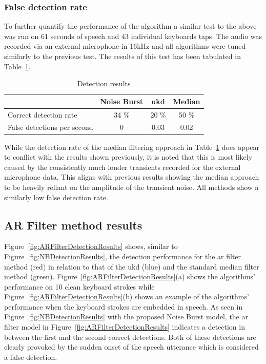 \subsubsection{False detection rate}\label{corrections:further_quantify}
To further quantify the performance of the algorithm a similar test to the above was run on 61 seconds of speech and 43 individual keyboards taps. The audio was recorded via an external microphone in 16kHz and all algorithms were tuned similarly to the previous test. The results of this test has been tabulated in Table~\ref{table:NBResultsTest}.

\begin{table}
\caption{Detection results}
\centering
\begin{tabular}{|l | c c c|}
\hline
                            & Noise Burst   & \gls{ukd}       & Median        \\
 \hline
 Correct detection rate     & 34 \%         & 20 \%     & 50 \%         \\
 False detections per second& 0             & 0.03      & 0.02          \\
 \hline
 \end{tabular}
 \label{table:NBResultsTest}
\end{table}

While the detection rate of the median filtering approach in Table~\ref{table:NBResultsTest} does appear to conflict with the results shown previously, it is noted that this is most likely caused by the consistently much louder transients recorded for the external microphone data. This aligns with previous results showing the median approach to be heavily reliant on the amplitude of the transient noise. All methods show a similarly low false detection rate.

\subsection{AR Filter method results}
Figure~\ref{fig:ARFilterDetectionResults} shows, similar to Figure~\ref{fig:NBDetectionResults}, the detection performance for the \gls{ar} filter method (red) in relation to that of the \gls{ukd}\cite{Subramanya2007} (blue) and the standard median filter method (green). Figure~\ref{fig:ARFilterDetectionResults}(a) shows the algorithms' performance on 10 clean keyboard strokes while Figure~\ref{fig:ARFilterDetectionResults}(b) shows an example of the algorithms' performance when the keyboard strokes are embedded in speech. As seen in Figure~\ref{fig:NBDetectionResults} with the proposed Noise Burst model, the \gls{ar} filter model in Figure~\ref{fig:ARFilterDetectionResults} indicates a detection in between the first and the second correct detections. Both of these detections are clearly provoked by the sudden onset of the speech utterance which is considered a false detection.

